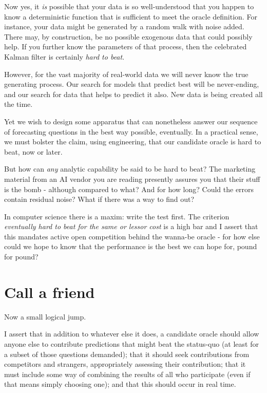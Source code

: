 Now yes, it {\em is} possible that your data is so well-understood that you happen to know a deterministic function that is sufficient to meet the oracle definition. For instance, your data might be generated by a random walk with noise added. There may, by construction, be no possible exogenous data that could possibly help. If you further know the parameters of that process, then the celebrated Kalman filter is certainly {\em hard to beat}. 

However, for the vast majority of real-world data we will never know the true generating process. Our search for models that predict best will be never-ending, and our search for data that helps to predict it also. New data is being created all the time. 

Yet we wish to design some apparatus that can nonetheless answer our sequence of forecasting questions in the best way possible, eventually. In a practical sense, we must bolster the claim, using engineering, that our candidate oracle is hard to beat, now or later. 

But how can {\em any} analytic capability be said to be hard to beat? The marketing material from an AI vendor you are reading presently assures you that their stuff is the bomb - although compared to what? And for how long? Could the errors contain residual noise? What if there was a way to find out? 

In computer science there is a maxim: write the test first. 
The criterion {\em eventually hard to beat for the same or lessor cost} is a high bar and I assert that this mandates active open competition behind the wanna-be oracle - for how else could we hope to know that the performance is the best we can hope for, pound for pound? 


\section{Call a friend}

Now a small logical jump. 

I assert that in addition to whatever else it does, a candidate oracle should allow anyone else to contribute predictions that might beat the status-quo (at least for a subset of those questions demanded); that it should seek contributions from competitors and strangers, appropriately assessing their contribution; that it must include some way of combining the results of all who participate (even if that means simply choosing one); and that this should occur in real time.

